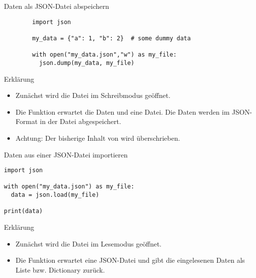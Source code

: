 \begin{fragile}
	\begin{block}{Daten als JSON-Datei abspeichern}
		\vspace{2pt}
		
		\begin{verbatim}
		import json 
		
		my_data = {"a": 1, "b": 2}  # some dummy data
		
		with open("my_data.json","w") as my_file:
		  json.dump(my_data, my_file)
		\end{verbatim}
		
		\pause
		
		\vspace{12pt}
		
		\begin{exampleblock}{Erklärung}
			\vspace{2pt}
			\begin{itemize}[<+->]
				\item Zunächst wird die Datei  im Schreibmodus geöffnet.  
				\item Die Funktion  erwartet die Daten und eine Datei. Die Daten werden im JSON-Format in der Datei abgespeichert. 
				\item Achtung: Der bisherige Inhalt von  wird überschrieben.  
			\end{itemize}
		\end{exampleblock}
	\end{block}
\end{fragile}


\begin{fragile}
\begin{block}{Daten aus einer JSON-Datei importieren}
\vspace{2pt}

\begin{verbatim}
import json 

with open("my_data.json") as my_file:
  data = json.load(my_file)
  
print(data)
\end{verbatim}

\pause

\vspace{12pt}

\begin{exampleblock}{Erklärung}
\vspace{2pt}
\begin{itemize}[<+->]
\item Zunächst wird die Datei  im Lesemodus geöffnet.  
\item Die Funktion  erwartet eine JSON-Datei und gibt die eingelesenen Daten als Liste bzw. Dictionary zurück.  
\end{itemize}
\end{exampleblock}
\end{block}
\end{fragile}






